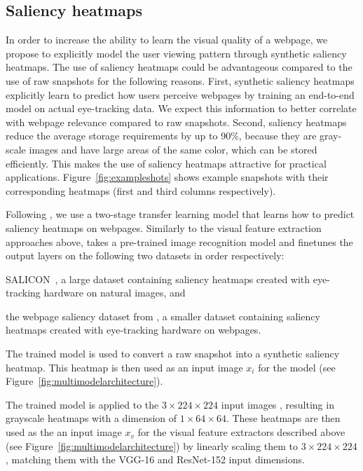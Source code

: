 \subsection{Saliency heatmaps} \label{sec:saliency}
In order to increase the ability to learn the visual quality of a webpage, we propose to explicitly model the user viewing pattern through synthetic saliency heatmaps.
The use of saliency heatmaps could be advantageous compared to the use of raw snapshots for the following reasons.
First, synthetic saliency heatmaps explicitly learn to predict how users perceive webpages by training an end-to-end model on actual eye-tracking data.
We expect this information to better correlate with webpage relevance compared to raw snapshots.
Second, saliency heatmaps reduce the average storage requirements by up to 90\%,
because they are gray-scale images and have large areas of the same color, which can be stored efficiently.
This makes the use of saliency heatmaps attractive for practical applications.
Figure~\ref{fig:exampleshots} shows example snapshots with their corresponding heatmaps (first and third columns respectively).

Following \cite{shan2017two}, we use a two-stage transfer learning model that learns how to predict saliency heatmaps on webpages.
Similarly to the visual feature extraction approaches above, \cite{shan2017two} takes a pre-trained image recognition model and finetunes the output layers on the following two datasets in order respectively:
\begin{inparaenum}[(i)]
\item SALICON~\cite{jiang2015salicon}, a large dataset containing saliency heatmaps created with eye-tracking hardware on natural images, and 
\item the webpage saliency dataset from \cite{shen2014webpage}, a smaller dataset containing saliency heatmaps created with eye-tracking hardware on webpages.
\end{inparaenum}

The trained model is used to convert a raw snapshot into a synthetic saliency heatmap. This heatmap is then used as an input image $x_i$ for the \modelname{} model (see Figure~\ref{fig:multimodelarchitecture}).

The trained model is applied to the $3\times224\times224$ input images , resulting in grayscale heatmaps with a dimension of $1\times64\times64$.
These heatmaps are then used as the an input image $x_{v}$ for the visual feature extractors described above (see Figure~\ref{fig:multimodelarchitecture}) by linearly scaling them to $3\times224\times224$, matching them with the VGG-16 and ResNet-152 input dimensions.
\fi